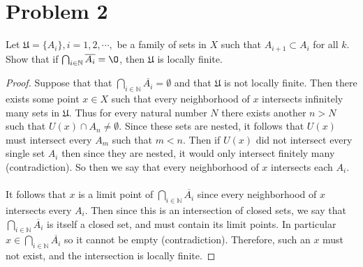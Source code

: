 \documentclass{article}
\theoremstyle{definition}
\begin{document}
\section*{Problem 2}
    \begin{mdframed}
        Let $\mathfrak{U} = \{A_i\}, i = 1,2,\cdots,$ be a family of sets in $X$ such that $A_{i + 1} \subset A_i$ for all $k$.
        Show that if $\bigcap_{i \in \mathbb{N}}\overline{A_i} = \O$, then $\mathfrak{U}$ is locally finite.
    \end{mdframed}
    \begin{proof}
        Suppose that that $\bigcap_{i \in \mathbb{N}}\overline{A_i} = \emptyset$ and that $\mathfrak{U}$ is not locally finite.
        Then there exists some point $x \in X$ such that every neighborhood of $x$ intersects infinitely many sets in $\mathfrak{U}$. Thus for every natural number
        $N$ there exists another $n > N$ such that $U(x) \cap A_n \neq \emptyset$. Since these sets are nested, it follows that $U(x)$ must intersect 
        every $A_m$ such that $m < n$. Then if $U(x)$ did not intersect every single set $A_i$ then since they are nested, it 
        would only intersect finitely many (contradiction). So then we say that every neighborhood of $x$ intersects each $A_i$.\\\\
        It follows that $x$ is a limit point of $\bigcap_{i \in \mathbb{N}}\overline{A_i}$ since every neighborhood of $x$ intersects 
        every $A_i$. Then since this is an intersection of closed sets, we say that $\bigcap_{i \in \mathbb{N}}\overline{A_i}$ is itself a closed
        set, and must contain its limit points. In particular $x \in \bigcap_{i \in \mathbb{N}}\overline{A_i}$ so it cannot be empty (contradiction).
        Therefore, such an $x$ must not exist, and the intersection is locally finite.
    \end{proof}
\end{document}
